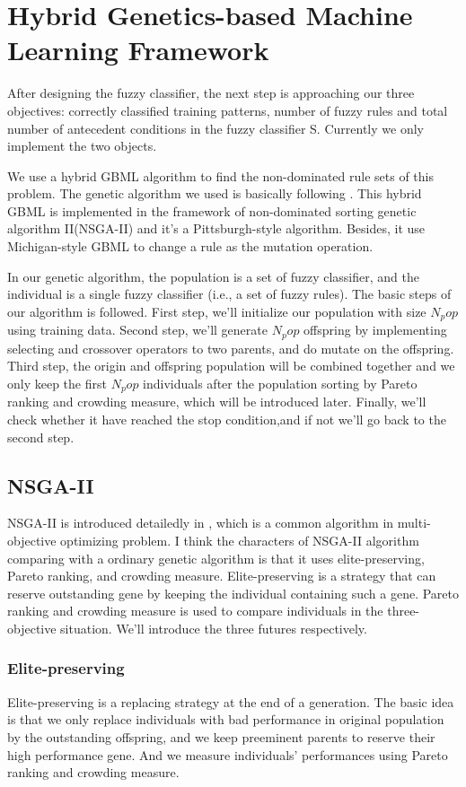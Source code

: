 \documentclass[conference]{IEEEtran}
\begin{document}
  \section{Hybrid Genetics-based Machine Learning Framework}
	 \par After designing the fuzzy classifier, the next step is approaching our three objectives: correctly classified training patterns, number of fuzzy rules and total number of antecedent conditions in the fuzzy classifier S. Currently we only implement the two objects.
	 \par
	 We use a hybrid GBML algorithm to find the non-dominated rule sets of this problem. The genetic algorithm we used is basically following \cite{ISHIBUCHI20074}. This hybrid GBML is implemented in the framework of non-dominated sorting genetic algorithm II(NSGA-II) and it's a Pittsburgh-style algorithm. Besides, it use Michigan-style GBML to change a rule as the mutation operation. 
	 \par
	In our genetic algorithm, the population is a set of fuzzy classifier, and the individual is a single fuzzy classifier (i.e., a set of fuzzy rules). The basic steps of our algorithm is followed. First step, we'll initialize our population with size $N_pop$ using training data. Second step, we'll generate $N_pop$ offspring by implementing selecting and crossover operators to two parents, and do mutate on the offspring. Third step, the origin and offspring population will be combined together and we only keep the first $N_pop$ individuals after the population sorting by Pareto ranking and crowding measure, which will be introduced later. Finally, we'll check whether it have reached the stop condition,and if not we'll go back to the second step.
	 
	 \subsection{NSGA-II}
	 \par
	 NSGA-II is introduced detailedly in \cite{996017}, which is a common algorithm in multi-objective optimizing problem. I think the characters of NSGA-II algorithm comparing with a ordinary genetic algorithm is that it uses elite-preserving, Pareto ranking, and crowding measure. Elite-preserving is a strategy that can reserve outstanding gene by keeping the individual containing such a gene. Pareto ranking and crowding measure is used to compare individuals in the three-objective situation. We'll introduce the three futures respectively.
	 \subsubsection{Elite-preserving}
	 \par
	 Elite-preserving is a replacing strategy at the end of a generation. The basic idea is that we only replace individuals with bad performance in original population by the outstanding offspring, and we keep preeminent parents to reserve their high performance gene. And we measure individuals' performances using Pareto ranking and crowding measure.
	 
\end{document}
